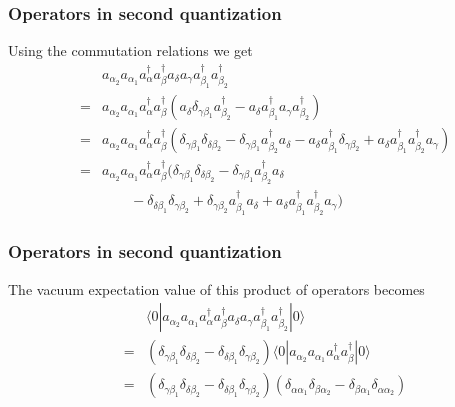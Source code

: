 \documentclass{beamer}
\begin{document}
\begin{frame}
\frametitle{Operators in second quantization}

\begin{block}{}
Using the commutation relations we get 
\begin{eqnarray}
	&& a_{\alpha_2} a_{\alpha_1}a^{\dagger}_\alpha a^{\dagger}_\beta 
		a_\delta a_\gamma a_{\beta_1}^{\dagger} a_{\beta_2}^{\dagger} \nonumber \\
	&=& a_{\alpha_2} a_{\alpha_1}a^{\dagger}_\alpha a^{\dagger}_\beta 
		( a_\delta \delta_{\gamma \beta_1} a_{\beta_2}^{\dagger} - 
		a_\delta  a_{\beta_1}^{\dagger} a_\gamma a_{\beta_2}^{\dagger} ) \nonumber \\
	&=& a_{\alpha_2} a_{\alpha_1}a^{\dagger}_\alpha a^{\dagger}_\beta 
		(\delta_{\gamma \beta_1} \delta_{\delta \beta_2} - \delta_{\gamma \beta_1} a_{\beta_2}^{\dagger} a_\delta -
		a_\delta a_{\beta_1}^{\dagger}\delta_{\gamma \beta_2} +
		a_\delta a_{\beta_1}^{\dagger} a_{\beta_2}^{\dagger} a_\gamma ) \nonumber \\
	&=& a_{\alpha_2} a_{\alpha_1}a^{\dagger}_\alpha a^{\dagger}_\beta 
		(\delta_{\gamma \beta_1} \delta_{\delta \beta_2} - \delta_{\gamma \beta_1} a_{\beta_2}^{\dagger} a_\delta \nonumber \\
		&& \qquad - \delta_{\delta \beta_1} \delta_{\gamma \beta_2} + \delta_{\gamma \beta_2} a_{\beta_1}^{\dagger} a_\delta
		+ a_\delta a_{\beta_1}^{\dagger} a_{\beta_2}^{\dagger} a_\gamma ) \label{eq:2-41}
\end{eqnarray}
\end{block}
\end{frame}

\begin{frame}
\frametitle{Operators in second quantization}

\begin{block}{}
The vacuum expectation value of this product of operators becomes
\begin{eqnarray}
	&& \langle 0|a_{\alpha_2} a_{\alpha_1} a^{\dagger}_\alpha a^{\dagger}_\beta a_\delta a_\gamma 
		a_{\beta_1}^{\dagger} a_{\beta_2}^{\dagger}|0\rangle \nonumber \\
	&=& (\delta_{\gamma \beta_1} \delta_{\delta \beta_2} -
		\delta_{\delta \beta_1} \delta_{\gamma \beta_2} ) 
		\langle 0|a_{\alpha_2} a_{\alpha_1}a^{\dagger}_\alpha a^{\dagger}_\beta|0\rangle \nonumber \\
	&=& (\delta_{\gamma \beta_1} \delta_{\delta \beta_2} -\delta_{\delta \beta_1} \delta_{\gamma \beta_2} )
	(\delta_{\alpha \alpha_1} \delta_{\beta \alpha_2} -\delta_{\beta \alpha_1} \delta_{\alpha \alpha_2} ) \label{eq:2-42b}
\end{eqnarray}
\end{block}
\end{frame}
\end{document}

